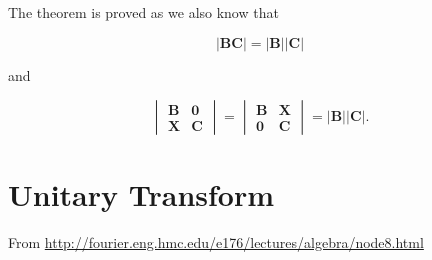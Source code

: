 \documentclass[10pt,b5paper,titlepage]{book}
\begin{document}
\begin{itemize}
        The theorem is proved as we also know that

        \begin{equation}
            |\mathbf{B} \mathbf{C}| = |\mathbf{B}| |\mathbf{C}|
        \end{equation}

        and

        \begin{equation}
            \begin{vmatrix}
                \mathbf{B} & \mathbf{0}\\
                \mathbf{X} & \mathbf{C}
            \end{vmatrix} = \begin{vmatrix}
                \mathbf{B} & \mathbf{X}\\
                \mathbf{0} & \mathbf{C}
            \end{vmatrix} = |\mathbf{B}| |\mathbf{C}|
        .\end{equation}
\end{itemize}




\chapter{Unitary Transform}
From \url{http://fourier.eng.hmc.edu/e176/lectures/algebra/node8.html}\\
\end{document}
